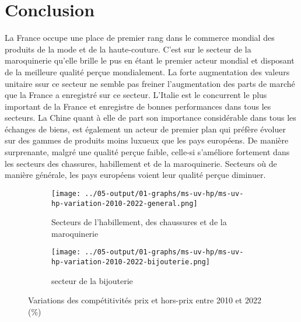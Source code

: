 \documentclass[french,10pt,a4paper]{article}
\begin{document}
\section{Conclusion}
La France occupe une place de premier rang dans le commerce mondial des produits de la mode et de la haute-couture. C'est sur le secteur de la maroquinerie qu'elle brille le pus en étant le premier acteur mondial et disposant de la meilleure qualité perçue mondialement. La forte augmentation des valeurs unitaire ssur ce secteur ne semble pas freiner l'augmentation des parts de marché que la France a enregistré sur ce secteur. L'Italie est le concurrent le plus important de la France et enregistre de bonnes performances dans tous les secteurs. La Chine quant à elle de part son importance considérable dans tous les échanges de biens, est également un acteur de premier plan qui préfère évoluer sur des gammes de produits moins luxueux que les pays européens. De manière surprenante, malgré une qualité perçue faible, celle-si s'améliore fortement dans les secteurs des chassures, habillement et de la maroquinerie. Secteurs où de manière générale, les pays européens voient leur qualité perçue diminuer. 

\begin{figure}[!h]
  \centering
  \begin{subfigure}{\textwidth}
    \centering    \texttt{[image: ../05-output/01-graphs/ms-uv-hp/ms-uv-hp-variation-2010-2022-general.png]}
    \caption{Secteurs de l'habillement, des chaussures et de la maroquinerie}
    \label{fig:ms-uv-hp-variation-2010-2022-general}
  \end{subfigure}
  \vspace{0.5cm}
  \begin{subfigure}{\textwidth}
    \centering \texttt{[image: ../05-output/01-graphs/ms-uv-hp/ms-uv-hp-variation-2010-2022-bijouterie.png]}
 \caption{secteur de la bijouterie}
 \label{fig:ms-uv-hp-variation-2010-2022-bijouterie}
  \end{subfigure}
  \caption{Variations des compétitivités prix et hors-prix entre 2010 et 2022 (\%)}
  \label{fig:ms-uv-hp-variation-2010-2022-bijouterie}
\end{figure}



\newpage


\end{document}
